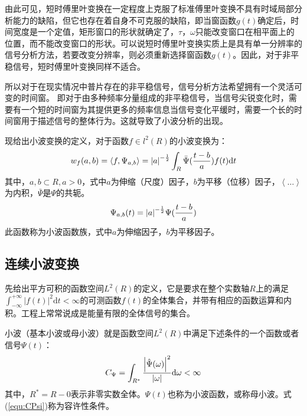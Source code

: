 由此可见，短时傅里叶变换在一定程度上克服了标准傅里叶变换不具有时域局部分析能力的缺陷，但它也存在着自身不可克服的缺陷，即当窗函数$g(t)$确定后，时间宽度是一个定值，矩形窗口的形状就确定了，$\tau$，$\omega$只能改变窗口在相平面上的位置，而不能改变窗口的形状。可以说短时傅里叶变换实质上是具有单一分辨率的信号分析方法，若要改变分辨率，则必须重新选择窗函数$g(t)$。因此，对于非平稳信号，短时傅里叶变换同样不适合。

所以对于在现实情况中普片存在的非平稳信号，信号分析方法希望拥有一个灵活可变的时间窗。 即对于由多种频率分量组成的非平稳信号，当信号尖锐变化时，需要有一个短的时间窗为其提供更多的频率信息当信号变化平缓时，需要一个长的时间窗用于描述信号的整体行为。这就导致了小波分析的出现。

现给出小波变换的定义，对于函数$f\in l^2(R)$的小波变换为：
\begin{equation}
	w_{f}(a,b) = \left\langle f,\Psi_{a,b}\right\rangle = {\left| a\right| }^{-{1\over2}}  \int_R \bar{\Psi}({t-b\over a}) f(t) \mathrm{d}t
\end{equation}
其中，$ a,b \subset R , a>0$，式中$a$为伸缩（尺度）因子，$b$为平移（位移）因子，$\left\langle \dots\right\rangle$为内积，${\bar{\Psi}}$是$\Psi$的共轭。
\begin{equation}
	\Psi_{a,b}(t) = {\left| a\right| }^{-{1\over2}} \Psi({t-b\over a})
\end{equation}
此函数称为小波函数族，式中$a$为伸缩因子，$b$为平移因子。

\subsection{连续小波变换}
先给出平方可积的函数空间$ L^2(R) $的定义，它是要求在整个实数轴$R$上的满足$ \int_{-\infty}^{+\infty}\left|f(t)\right|^2\mathrm{d}t < \infty $的可测函数$f(t)$的全体集合，并带有相应的函数运算和内积。工程上常常说成是能量有限的全体信号的集合。

小波（基本小波或母小波）就是函数空间$ L^2(R) $中满足下述条件的一个函数或者信号$\Psi(t)$：
\begin{equation}
\label{equ:CPsi}
	C_{\Psi} = \int_{R^*} 
	{{\left|\hat{\Psi}(\omega) \right|}^2 \over \left| \omega \right| }
	 \mathrm{d}\omega < \infty
\end{equation}
其中，$R^{*}=R-{0}$表示非零实数全体。$\Psi(t)$也称为小波函数，或称母小波。式(\ref{equ:CPsi})称为容许性条件。

